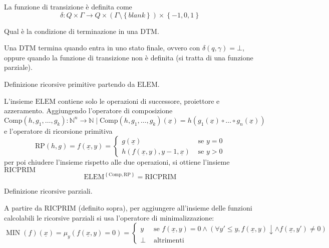 \documentclass[12pt, answers]{exam}
\theoremstyle{plain}
\DeclareMathOperator{\MIN}{MIN}
\newcommand{\elem}{\text{ELEM}}
\newcommand{\comp}{\text{Comp}}
\newcommand{\rp}{\text{RP}}
\newcommand{\ricprim}{\text{RICPRIM}}
\newcommand{\N}{\mathbb{N}}
\begin{document}
\begin{questions}
\begin{solution}
            La funzione di transizione è definita come
            $$ \delta: Q \times \Gamma \rightarrow Q \times (\Gamma \setminus \left\{ blank \right\}) \times \left\{-1, 0, 1\right\} $$
        \end{solution}
        
        \question Qual è la condizione di terminazione in una DTM.
        
        \begin{solution}
            Una DTM termina quando entra in uno stato finale, ovvero con $\delta (q, \gamma) = \bot$, oppure quando la funzione di transizione non è definita (si tratta di una funzione parziale).
        \end{solution}
        
        \question Definizione ricorsive primitive partendo da $\elem$.
        
        \begin{solution}
            L'insieme $\elem$ contiene solo le operazioni di successore, proiettore e azzeramento. Aggiungendo l'operatore di composizione 
            $$ \comp (h, g_1, \dots, g_k): \N^n \rightarrow \N \mid \comp (h, g_1, \dots, g_k) (\underline{x}) = h(g_1 (\underline{x}) \circ \dots \circ g_n (\underline{x})) $$
            e l'operatore di ricorsione primitiva
            $$ \rp (h, g) = f(\underline{x}, y) = \begin{cases}
                g(\underline{x}) & \text{ se } y = 0 \\
                h(f(\underline{x}, y), y-1, \underline{x}) & \text{ se } y > 0 
            \end{cases}$$
            per poi chiudere l'insieme rispetto alle due operazioni, si ottiene l'insieme $\ricprim$
            $$ \elem^{\left\{\comp, \rp\right\}} = \ricprim $$
        \end{solution}
        
        \question Definizione ricorsive parziali.
        
        \begin{solution}
            A partire da $\ricprim$ (definito sopra), per aggiungere all'insieme delle funzioni calcolabili le ricorsive parziali si usa l'operatore di minimalizzazione: 
            $$ \MIN (f) (\underline{x}) = \mu_y (f(\underline{x}, y) = 0) = \begin{cases}
                y & \text{ se } f(\underline{x}, y) = 0 \wedge (\forall y' \leq y, f(\underline{x}, y) \downarrow \wedge f(\underline{x}, y') \neq 0) \\
                \bot & \text{ altrimenti}
            \end{cases} $$
            

\end{solution}
\end{questions}
\end{document}
